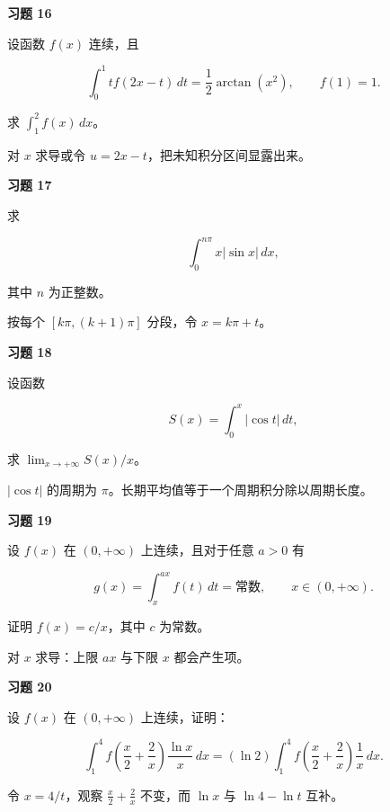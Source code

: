 \begin{exercisebox}
\textbf{习题 16 }

设函数 \(f(x)\) 连续，且

\[
      \int_0^1tf(2x-t)\,dt=\frac12\arctan(x^2),\qquad f(1)=1.
      \]

求 \(\int_1^2 f(x)\,dx\)。

\begin{hintbox}
对 \(x\) 求导或令 \(u=2x-t\)，把未知积分区间显露出来。
\end{hintbox}
\end{exercisebox}

\begin{exercisebox}
\textbf{习题 17 }

求

\[
      \int_0^{n\pi}x|\sin x|\,dx,
      \]

其中 \(n\) 为正整数。

\begin{hintbox}
按每个 \([k\pi,(k+1)\pi]\) 分段，令 \(x=k\pi+t\)。
\end{hintbox}
\end{exercisebox}

\begin{exercisebox}
\textbf{习题 18 }

设函数

\[
      S(x)=\int_0^x|\cos t|\,dt,
      \]

求 \(\lim_{x\to+\infty}S(x)/x\)。

\begin{hintbox}
\(|\cos t|\) 的周期为 \(\pi\)。长期平均值等于一个周期积分除以周期长度。
\end{hintbox}
\end{exercisebox}

\begin{exercisebox}
\textbf{习题 19 }

设 \(f(x)\) 在 \((0,+\infty)\) 上连续，且对于任意 \(a>0\) 有

\[
      g(x)=\int_x^{ax}f(t)\,dt=\text{常数},\qquad x\in(0,+\infty).
      \]

证明 \(f(x)=c/x\)，其中 \(c\) 为常数。

\begin{hintbox}
对 \(x\) 求导：上限 \(ax\) 与下限 \(x\) 都会产生项。
\end{hintbox}
\end{exercisebox}

\begin{exercisebox}
\textbf{习题 20 }

设 \(f(x)\) 在 \((0,+\infty)\) 上连续，证明：

\[
      \int_1^4 f\!\left(\frac{x}{2}+\frac{2}{x}\right)\frac{\ln x}{x}\,dx
      =
      (\ln2)\int_1^4 f\!\left(\frac{x}{2}+\frac{2}{x}\right)\frac{1}{x}\,dx.
      \]

\begin{hintbox}
令 \(x=4/t\)，观察 \(\frac{x}{2}+\frac{2}{x}\) 不变，而 \(\ln x\) 与 \(\ln 4-\ln t\) 互补。
\end{hintbox}
\end{exercisebox}

